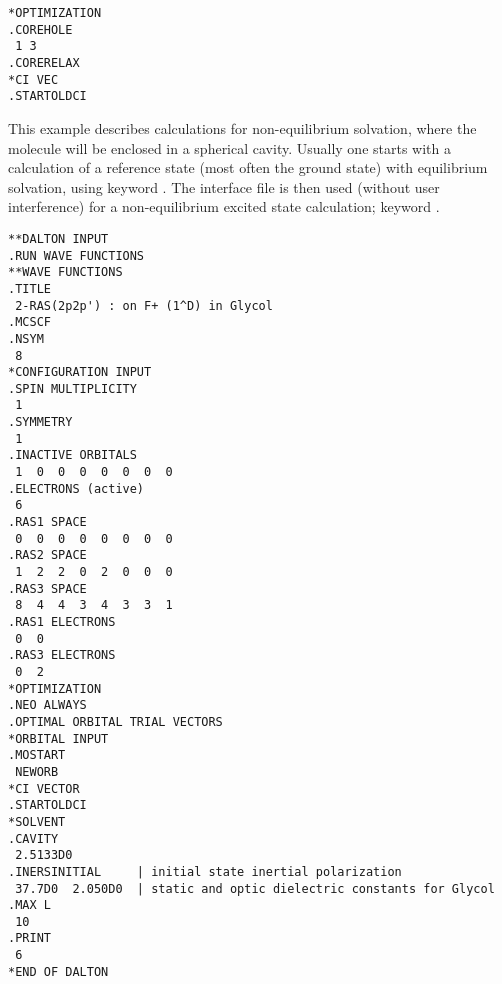\begin{verbatim}
*OPTIMIZATION
.COREHOLE
 1 3
.CORERELAX
*CI VEC
.STARTOLDCI
\end{verbatim}
\label{sirius_ex7}

\begin{center}
\end{center}

This example describes calculations for non-equilibrium
solvation, where the mole\-cule will
be enclosed in a spherical cavity. Usually one starts
with a calculation of a reference state (most often the ground
state) with equilibrium solvation, using keyword . The
interface file is then used (without user interference) for a
non-equilibrium excited state calculation; keyword .

\begin{verbatim}
**DALTON INPUT
.RUN WAVE FUNCTIONS
**WAVE FUNCTIONS
.TITLE
 2-RAS(2p2p') : on F+ (1^D) in Glycol
.MCSCF
.NSYM
 8
*CONFIGURATION INPUT
.SPIN MULTIPLICITY
 1
.SYMMETRY
 1
.INACTIVE ORBITALS
 1  0  0  0  0  0  0  0
.ELECTRONS (active)
 6
.RAS1 SPACE
 0  0  0  0  0  0  0  0
.RAS2 SPACE
 1  2  2  0  2  0  0  0
.RAS3 SPACE
 8  4  4  3  4  3  3  1
.RAS1 ELECTRONS
 0  0
.RAS3 ELECTRONS
 0  2
*OPTIMIZATION
.NEO ALWAYS
.OPTIMAL ORBITAL TRIAL VECTORS
*ORBITAL INPUT
.MOSTART
 NEWORB
*CI VECTOR
.STARTOLDCI
*SOLVENT
.CAVITY
 2.5133D0
.INERSINITIAL     | initial state inertial polarization
 37.7D0  2.050D0  | static and optic dielectric constants for Glycol
.MAX L
 10
.PRINT
 6
*END OF DALTON
\end{verbatim}
\label{sirius_ex8}
